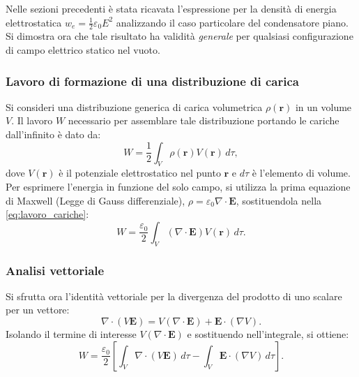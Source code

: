 \documentclass[a4paper,11pt]{report}
\begin{document}
\begin{approfondimento}[colback= white, colframe=green!35!black, no shadow, title={Validità generale della densità di energia elettrostatica}]
Nelle sezioni precedenti è stata ricavata l'espressione per la densità di energia elettrostatica $w_e = \frac{1}{2}\varepsilon_0 E^2$ analizzando il caso particolare del condensatore piano. Si dimostra ora che tale risultato ha validità \textit{generale} per qualsiasi configurazione di campo elettrico statico nel vuoto.
\subsubsection{Lavoro di formazione di una distribuzione di carica}
Si consideri una distribuzione generica di carica volumetrica $\rho(\bm{r})$ in un volume $V$. Il lavoro $W$ necessario per assemblare tale distribuzione portando le cariche dall'infinito è dato da:
\begin{equation}
    W = \frac{1}{2} \int_V \rho(\bm{r}) V(\bm{r}) \, d\tau,
    \label{eq:lavoro_cariche}
\end{equation}
dove $V(\bm{r})$ è il potenziale elettrostatico nel punto $\bm{r}$ e $d\tau$ è l'elemento di volume.
Per esprimere l'energia in funzione del solo campo, si utilizza la prima equazione di Maxwell (Legge di Gauss differenziale), $\rho = \varepsilon_0 \nabla \cdot \bm{E}$, sostituendola nella \eqref{eq:lavoro_cariche}:
\begin{equation}
    W = \frac{\varepsilon_0}{2} \int_V (\nabla \cdot \bm{E}) V(\bm{r}) \, d\tau.
\end{equation}

\subsubsection{Analisi vettoriale}
Si sfrutta ora l'identità vettoriale per la divergenza del prodotto di uno scalare per un vettore:
\begin{equation}
    \nabla \cdot (V \bm{E}) = V (\nabla \cdot \bm{E}) + \bm{E} \cdot (\nabla V).
\end{equation}
Isolando il termine di interesse $V (\nabla \cdot \bm{E})$ e sostituendo nell'integrale, si ottiene:
\begin{equation}
    W = \frac{\varepsilon_0}{2} \left[ \int_V \nabla \cdot (V \bm{E}) \, d\tau - \int_V \bm{E} \cdot (\nabla V) \, d\tau \right].
\end{equation}


\end{approfondimento}
\end{document}
